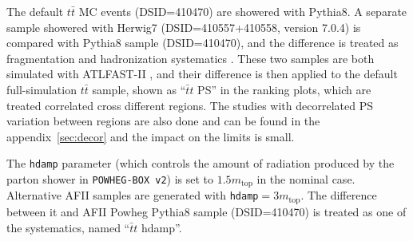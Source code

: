 The default $t\bar{t}$ MC events (DSID=410470) are showered with Pythia8. A separate sample showered with Herwig7 (DSID=410557+410558, version 7.0.4) is compared with Pythia8 sample (DSID=410470), and the difference is treated as fragmentation and hadronization systematics \cite{ttbarSys}. These two samples are both simulated with ATLFAST-II \cite{AFII}, and their difference is then applied to the default full-simulation $t\bar{t}$ sample, shown as ``$\bar{t}t$ PS'' in the ranking plots, which are treated correlated cross different regions. The studies with decorrelated PS variation between regions are also
done and can be found in the appendix~\ref{sec:decor} and the impact on the limits is small. 


The \texttt{hdamp} parameter (which controls the amount of radiation produced by the parton shower in \texttt{POWHEG-BOX v2}) is set to $1.5 m_{\text{top}}$ in the nominal case. Alternative AFII samples are generated with \texttt{hdamp}$=3 m_{\text{top}}$. The difference between it and AFII Powheg Pythia8 sample (DSID=410470) is treated as one of the systematics, named ``$\bar{t}t$ hdamp''.



